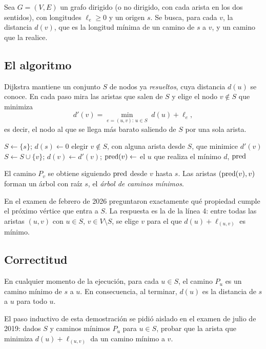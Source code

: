 Sea $G=(V,E)$ un grafo dirigido (o no dirigido, con cada arista en los dos sentidos), con longitudes $\ell_e\ge 0$ y un origen $s$. Se busca, para cada $v$, la distancia $d(v)$, que es la longitud mínima de un camino de $s$ a $v$, y un camino que la realice.

\subsection{El algoritmo}

Dijkstra mantiene un conjunto $S$ de nodos ya \emph{resueltos}, cuya distancia $d(u)$ se conoce. En cada paso mira las aristas que salen de $S$ y elige el nodo $v\notin S$ que minimiza
\[ d'(v)=\min_{e=(u,v):\,u\in S}\; d(u)+\ell_e , \]
es decir, el nodo al que se llega más barato saliendo de $S$ por una sola arista.

\begin{algorithmic}[1]
  \State $S\gets\{s\}$; $d(s)\gets 0$
    \State elegir $v\notin S$, con alguna arista desde $S$, que minimice $d'(v)$
    \State $S\gets S\cup\{v\}$; $d(v)\gets d'(v)$; $\mathrm{pred}(v)\gets$ el $u$ que realiza el mínimo
  \EndWhile
  \State \Return $d$, $\mathrm{pred}$
\EndFunction
\end{algorithmic}

El camino $P_v$ se obtiene siguiendo $\mathrm{pred}$ desde $v$ hasta $s$. Las aristas $(\mathrm{pred}(v),v)$ forman un árbol con raíz $s$, el \emph{árbol de caminos mínimos}.

En el examen de febrero de 2026 preguntaron exactamente qué propiedad cumple el próximo vértice que entra a $S$. La respuesta es la de la línea 4: entre todas las aristas $(u,v)$ con $u\in S$, $v\in V\setminus S$, se elige $v$ para el que $d(u)+\ell_{(u,v)}$ es mínimo.

\subsection{Correctitud}

\begin{resultado}[(4.14)]
En cualquier momento de la ejecución, para cada $u\in S$, el camino $P_u$ es un camino mínimo de $s$ a $u$. En consecuencia, al terminar, $d(u)$ es la distancia de $s$ a $u$ para todo $u$.
\end{resultado}

El paso inductivo de esta demostración se pidió aislado en el examen de julio de 2019: dados $S$ y caminos mínimos $P_u$ para $u\in S$, probar que la arista que minimiza $d(u)+\ell_{(u,v)}$ da un camino mínimo a $v$.

